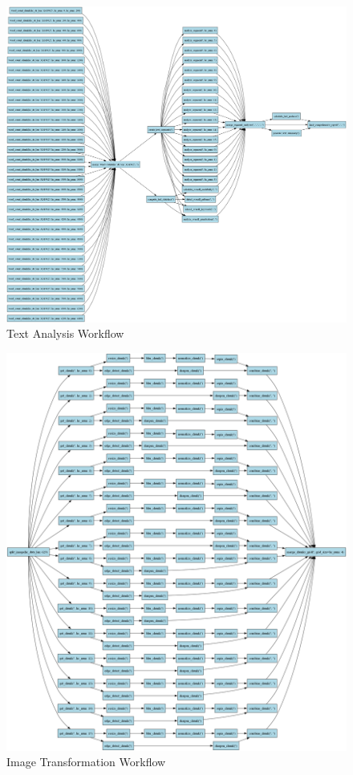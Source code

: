 \documentclass[conference]{IEEEtran}
\begin{document}
\begin{figure}[h]
    \centering
    \includegraphics[width=\linewidth, height=0.85\textheight]{figures/dag_image_text_analysis.png}
    \caption{Text Analysis Workflow}
    \label{fig:text_analysis}
\end{figure}
\begin{figure}[h]
    \centering
    \includegraphics[width=\linewidth, height=0.85\textheight]{figures/dag_image_image_transformer.png}
    \caption{Image Transformation Workflow}
    \label{fig:image_transformer}
\end{figure}
\end{document}
